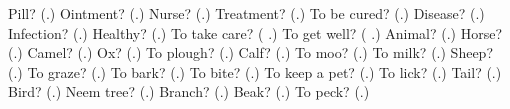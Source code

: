 \begin{tcolorbox}[breakable,colback=teal!4,colframe=teal!35!black,title={Before you move on}]
Pill? (\textbf{}.) Ointment? (\textbf{}.) Nurse? (\textbf{}.) Treatment? (\textbf{}.) To be cured? (\textbf{}.) Disease? (\textbf{}.) Infection? (\textbf{}.) Healthy? (\textbf{}.) To take care? (\textbf{ }.) To get well? (\textbf{ }.) Animal? (\textbf{}.) Horse? (\textbf{}.) Camel? (\textbf{}.) Ox? (\textbf{}.) To plough? (\textbf{}.) Calf? (\textbf{}.) To moo? (\textbf{}.) To milk? (\textbf{}.) Sheep? (\textbf{}.) To graze? (\textbf{}.) To bark? (\textbf{}.) To bite? (\textbf{}.) To keep a pet? (\textbf{}.) To lick? (\textbf{}.) Tail? (\textbf{}.) Bird? (\textbf{}.) Neem tree? (\textbf{}.) Branch? (\textbf{}.) Beak? (\textbf{}.) To peck? (\textbf{}.)
\end{tcolorbox}
